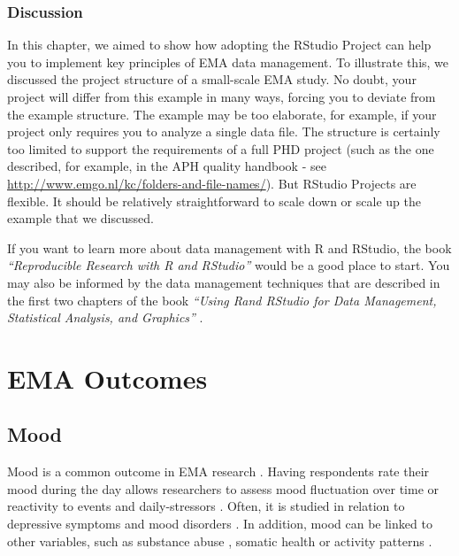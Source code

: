 \documentclass[]{book}
\begin{document}
\section{Discussion}\label{discussion}

In this chapter, we aimed to show how adopting the RStudio Project can
help you to implement key principles of EMA data management. To
illustrate this, we discussed the project structure of a small-scale EMA
study. No doubt, your project will differ from this example in many
ways, forcing you to deviate from the example structure. The example may
be too elaborate, for example, if your project only requires you to
analyze a single data file. The structure is certainly too limited to
support the requirements of a full PHD project (such as the one
described, for example, in the APH quality handbook - see
\url{http://www.emgo.nl/kc/folders-and-file-names/}). But RStudio
Projects are flexible. It should be relatively straightforward to scale
down or scale up the example that we discussed.

If you want to learn more about data management with R and RStudio, the
book \emph{``Reproducible Research with R and RStudio''}
\citep{gandrud2015} would be a good place to start. You may also be
informed by the data management techniques that are described in the
first two chapters of the book \emph{``Using Rand RStudio for Data
Management, Statistical Analysis, and Graphics''} \citep{horton2015}.

\part{EMA Outcomes}\label{part-ema-outcomes}

\chapter{Mood}\label{mood}

 


Mood is a common outcome in EMA research
\citep{Myin-Germeys2016, Desmet2016}. Having respondents rate their mood
during the day allows researchers to assess mood fluctuation over time
or reactivity to events and daily-stressors \citep{Wenze2010}. Often, it
is studied in relation to depressive symptoms and mood disorders
\citep{AanhetRot2012}. In addition, mood can be linked to other
variables, such as substance abuse \citep{Kirchner2013, Serre2015},
somatic health \citep{Engel2016, Moore2016} or activity patterns
\citep{Dunton2017, Marszalek2014}.
\end{document}
